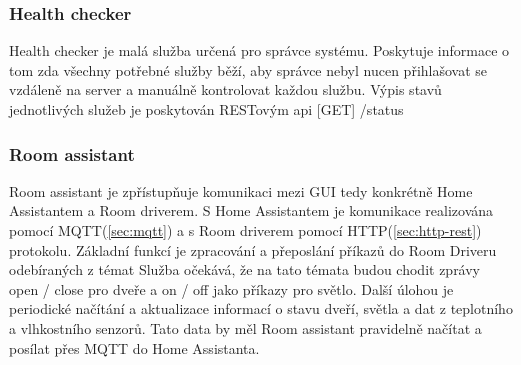 \subsubsection{Health checker}
Health checker je malá služba určená pro správce systému.\newline
Poskytuje informace o tom zda všechny potřebné služby běží, aby správce nebyl nucen přihlašovat se vzdáleně na server a manuálně kontrolovat každou službu.
Výpis stavů jednotlivých služeb je poskytován RESTovým api [GET] /status

\subsubsection{Room assistant}
Room assistant je zpřístupňuje komunikaci mezi GUI tedy konkrétně Home Assistantem a Room driverem.\newline
S Home Assistantem je komunikace realizována pomocí MQTT(\ref{sec:mqtt}) a s Room driverem pomocí HTTP(\ref{sec:http-rest}) protokolu.
Základní funkcí je zpracování a přeposlání příkazů do Room Driveru odebíraných z témat
Služba očekává, že na tato témata budou chodit zprávy open / close pro dveře a on / off jako příkazy pro světlo.
Další úlohou je periodické načítání a aktualizace informací o stavu dveří, světla a dat z teplotního a vlhkostního senzorů.
Tato data by měl Room assistant pravidelně načítat a posílat přes MQTT do Home Assistanta.

